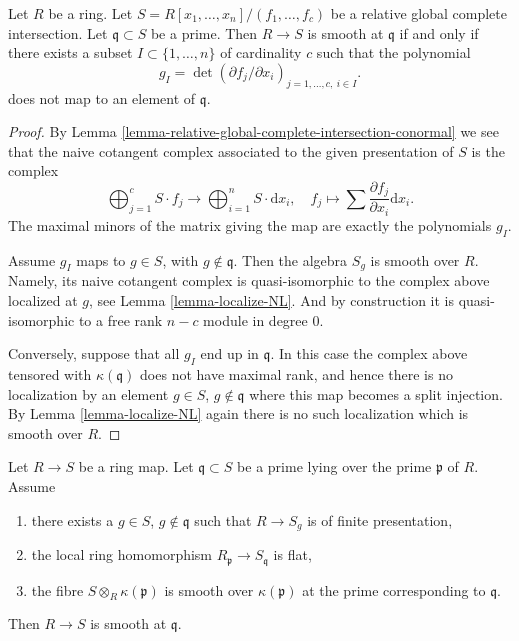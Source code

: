 \begin{lemma}
\label{lemma-relative-global-complete-intersection-smooth}
Let $R$ be a ring. Let $S = R[x_1, \ldots, x_n]/(f_1, \ldots, f_c)$
be a relative global complete intersection.
Let $\mathfrak q \subset S$ be a prime. Then $R \to S$
is smooth at $\mathfrak q$ if and only if there exists a
subset $I \subset \{1, \ldots, n\}$ of cardinality $c$
such that the polynomial
$$
g_I = \det (\partial f_j/\partial x_i)_{j = 1, \ldots, c, \ i \in I}.
$$
does not map to an element of $\mathfrak q$.
\end{lemma}

\begin{proof}
By Lemma \ref{lemma-relative-global-complete-intersection-conormal}
we see that the naive cotangent complex
associated to the given presentation of $S$ is the complex
$$
\bigoplus\nolimits_{j = 1}^c S \cdot f_j
\longrightarrow
\bigoplus\nolimits_{i = 1}^n S \cdot \text{d}x_i, \quad
f_j \longmapsto \sum \frac{\partial f_j}{\partial x_i} \text{d}x_i.
$$
The maximal minors of the matrix giving the map are exactly
the polynomials $g_I$.

\medskip\noindent
Assume $g_I$ maps to $g \in S$, with $g \not \in \mathfrak q$.
Then the algebra $S_g$ is smooth over $R$. Namely, its naive
cotangent complex is quasi-isomorphic to the complex above
localized at $g$, see Lemma \ref{lemma-localize-NL}. And by
construction it is quasi-isomorphic to a free rank $n - c$
module in degree $0$.

\medskip\noindent
Conversely, suppose that all $g_I$ end up in $\mathfrak q$.
In this case the complex above tensored with $\kappa(\mathfrak q)$
does not have maximal rank, and hence there is no localization
by an element $g \in S$, $g \not \in \mathfrak q$
where this map becomes a split injection. By Lemma \ref{lemma-localize-NL}
again there is no such localization which is smooth over $R$.
\end{proof}

\begin{lemma}
\label{lemma-flat-fibre-smooth}
Let $R \to S$ be a ring map.
Let $\mathfrak q \subset S$ be a prime lying over the
prime $\mathfrak p$ of $R$. Assume
\begin{enumerate}
\item there exists a $g \in S$, $g \not\in \mathfrak q$
such that $R \to S_g$ is of finite presentation,
\item the local ring homomorphism
$R_{\mathfrak p} \to S_{\mathfrak q}$ is flat,
\item the fibre $S \otimes_R \kappa(\mathfrak p)$ is smooth
over $\kappa(\mathfrak p)$ at the prime corresponding
to $\mathfrak q$.
\end{enumerate}
Then $R \to S$ is smooth at $\mathfrak q$.
\end{lemma}

